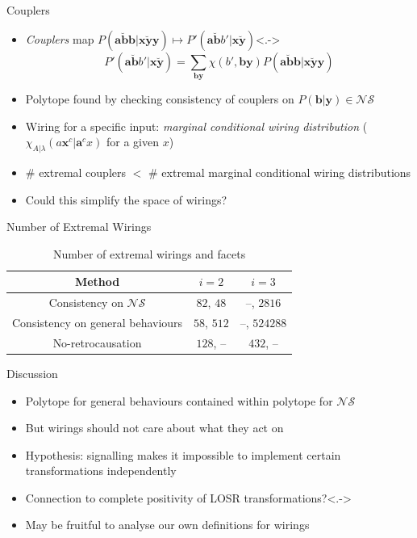 \documentclass[xcolor=dvipsnames]{beamer}
\newenvironment{Tabular}[1] %
{\def\arraystretch{1.75}\begin{tabular}{#1}}
{\end{tabular}}
\newcommand{\?}{\mathrel{?}} %
\newcommand{\cvec}[1]{\boldsymbol{\mathbf{#1}}}    %
\newcommand{\NSs}{\mathcal{NS}}
\begin{document}
\begin{frame}{Couplers}
  \begin{itemize}[<+->]
    \item \emph{Couplers} map \(P(\cvec{a\breve{b}b}|\cvec{x\breve{y}y}) \mapsto P'(\cvec{a\breve{b}}b'|\cvec{x\breve{y}})\)\only<.->{}
    \[ P'(\cvec{a\breve{b}}b'|\cvec{x\breve{y}}) = \sum_{\cvec{by}} \chi(b',\cvec{by})P(\cvec{a\breve{b}b}|\cvec{x\breve{y}y}) \]
    \item Polytope found by checking consistency of couplers on \(P(\cvec{b}|\cvec{y}) \in \NSs\)
    \item Wiring for a specific input: \emph{marginal conditional wiring distribution} (\(\chi_{A|\lambda}(a\cvec{x}^c|\cvec{a}^cx)\) for a given \(x\))
    \item \(\#\) extremal couplers \(<\) \(\#\) extremal marginal conditional wiring distributions
    \item Could this simplify the space of wirings?
  \end{itemize}
\end{frame}

\begin{frame}{Number of Extremal Wirings}
  \begin{table}
    \begin{Tabular}{ccc} 
      \toprule
      Method & \(i = 2\) & \(i = 3\) \\
      \midrule
      Consistency on \(\NSs\) & \(82\), \(48\)  & --, \(2816\) \\
      Consistency on general behaviours & \(58\), \(512\) & --, \(524288\) \\
      No-retrocausation & \(128\), -- & \(432\), -- \\
      \bottomrule
    \end{Tabular}
    \caption{Number of extremal wirings and facets}
  \end{table}
\end{frame}

\begin{frame}{Discussion}
  \begin{itemize}[<+->]
    \item Polytope for general behaviours contained within polytope for \(\NSs\)
    \item But wirings should not care about what they act on
    \item Hypothesis: signalling makes it impossible to implement certain transformations independently
    \item Connection to complete positivity of LOSR transformations?\only<.->{}
    \item May be fruitful to analyse our own definitions for wirings
  \end{itemize}
\end{frame}
\end{document}
